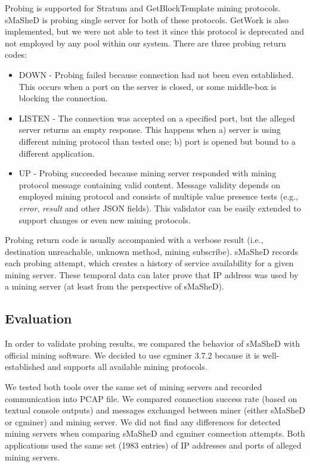 \documentclass[preprint,12pt,3p]{elsarticle}
\begin{document}
Probing is supported for Stratum and GetBlockTemplate mining protocols. sMaSheD is probing single server for both of these protocols. GetWork is also implemented, but we were not able to test it since this protocol is deprecated and not employed by any pool within our system. There are three probing return codes:

\begin{itemize}
    \item DOWN - Probing failed because connection had not been even established. This occurs when a port on the server is closed, or some middle-box is blocking the connection.
    \item LISTEN - The connection was accepted on a specified port, but the alleged server returns an empty response. This happens when a) server is using different mining protocol than tested one; b) port is opened but bound to a different application.
    \item UP - Probing succeeded because mining server responded with mining protocol message containing valid content. Message validity depends on employed mining protocol and consists of multiple value presence tests (e.g., \textit{error}, \textit{result} and other JSON fields). This validator can be easily extended to support changes or even new mining protocols.
\end{itemize}

Probing return code is usually accompanied with a verbose result (i.e., destination unreachable, unknown method, mining subscribe). sMaSheD records each probing attempt, which creates a history of service availability for a given mining server. These temporal data can later prove that IP address was used by a mining server (at least from the perspective of sMaSheD).

\subsection{Evaluation}
\label{subsec52}
In order to validate probing results, we compared the behavior of sMaSheD with official mining software. We decided to use cgminer 3.7.2 \cite{CGMINER} because it is well-established and supports all available mining protocols. 

We tested both tools over the same set of mining servers and recorded communication into PCAP file. We compared connection success rate (based on textual console outputs) and messages exchanged between miner (either sMaSheD or cgminer) and mining server. We did not find any differences for detected mining servers when comparing sMaSheD and cgminer connection attempts. Both applications used the same set (1983 entries) of IP addresses and ports of alleged mining servers. 
\end{document}
